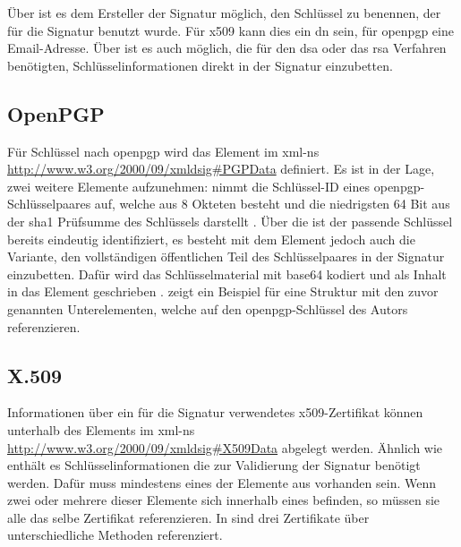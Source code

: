 Über  ist es dem Ersteller der Signatur möglich, den Schlüssel zu benennen, der für die Signatur benutzt wurde. Für \gls{x509} kann dies ein
\gls{dn} sein, für \gls{openpgp} eine Email-Adresse. Über  ist es auch möglich, die für den \gls{dsa} oder das \gls{rsa} Verfahren
benötigten, Schlüsselinformationen direkt in der Signatur einzubetten.

\subsection{OpenPGP}
Für Schlüssel nach \gls{openpgp} wird das Element  im \gls{xml-ns} \url{http://www.w3.org/2000/09/xmldsig#PGPData} definiert. Es ist in der
Lage, zwei weitere Elemente aufzunehmen:  nimmt die Schlüssel-ID eines \gls{openpgp}-Schlüsselpaares auf, welche aus 8 Okteten besteht und die
niedrigsten 64 Bit aus der \gls{sha1} Prüfsumme des Schlüssels darstellt \cite{rfc2440:ietf}. Über die  ist der passende Schlüssel bereits eindeutig
identifiziert, es besteht mit dem Element  jedoch auch die Variante, den vollständigen öffentlichen Teil des Schlüsselpaares in der
Signatur einzubetten. Dafür wird das Schlüsselmaterial mit \gls{base64} kodiert und als Inhalt in das Element geschrieben \cite{xml-dsig:w3c}.
 zeigt ein Beispiel für eine Struktur mit den zuvor genannten Unterelementen, welche auf den \gls{openpgp}-Schlüssel des Autors
referenzieren.



\subsection{X.509}
Informationen über ein für die Signatur verwendetes \gls{x509}-Zertifikat können unterhalb des Elements  im \gls{xml-ns}
\url{http://www.w3.org/2000/09/xmldsig#X509Data} abgelegt werden. 
Ähnlich wie  enthält es Schlüsselinformationen die zur Validierung der Signatur benötigt werden.  Dafür muss mindestens eines der Elemente aus
 vorhanden sein. Wenn zwei oder mehrere dieser Elemente sich innerhalb eines  befinden, so müssen sie alle das
selbe Zertifikat referenzieren. In  sind drei Zertifikate über unterschiedliche Methoden referenziert. 

